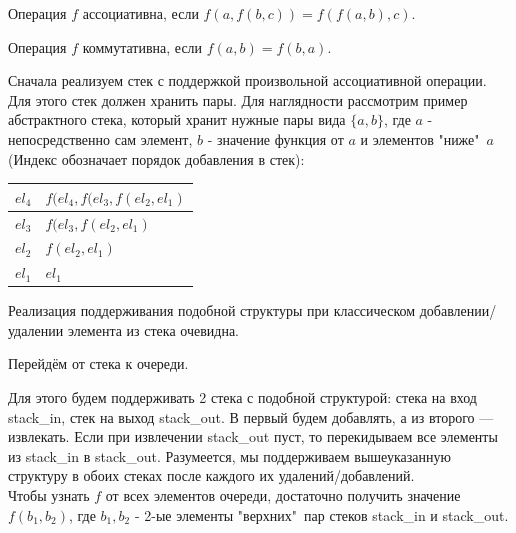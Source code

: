 \Def Операция $f$ ассоциативна, если $f (a, f (b, c)) = f (f (a, b), c)$.

\Def Операция $f$ коммутативна, если $f (a, b) = f (b, a)$.

Сначала реализуем стек с поддержкой произвольной ассоциативной операции. Для этого стек должен хранить пары. Для наглядности рассмотрим пример абстрактного стека, который хранит нужные пары вида $\{a, b\}$, где $a$ - непосредственно сам элемент, $b$ - значение функция от $a$ и элементов "ниже"\ $a$ (Индекс обозначает порядок добавления в стек):

\begin{table}[h]
\centering
\begin{tabular}{|l|l|}
\hline
$el_4$ & $f(el_4, f(el_3, f(el_2, el_1)$  \\
\hline
$el_3$ & $f(el_3, f(el_2, el_1)$           \\
\hline
$el_2$ & $f(el_2, el_1)$                    \\
\hline
$el_1$ & $el_1$\\
\hline
\end{tabular}
\end{table}

Реализация поддерживания подобной структуры при классическом добавлении/удалении элемента из стека очевидна.
\vspace{1cm}


Перейдём от стека к очереди.

Для этого будем поддерживать 2 стека с подобной структурой: стека на вход stack\_in, стек на выход stack\_out. В
первый будем добавлять, а из второго — извлекать.
Если при извлечении stack\_out пуст, то перекидываем все элементы
из stack\_in в stack\_out. Разумеется, мы поддерживаем вышеуказанную структуру в обоих стеках после каждого их удалений/добавлений.\\
Чтобы узнать $f$ от всех элементов очереди, достаточно получить значение $f(b_1, b_2)$, где $b_1, b_2$ - 2-ые элементы "верхних"\ пар стеков stack\_in и stack\_out.

\pagebreak